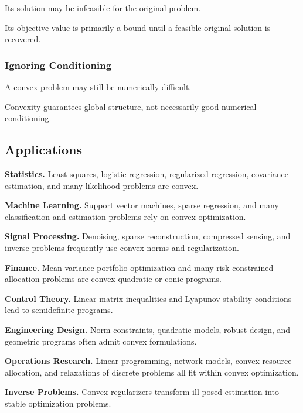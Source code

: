 Its solution may be infeasible for the original problem.

Its objective value is primarily a bound until a feasible original
solution is recovered.

\subsubsection{Ignoring Conditioning}

A convex problem may still be numerically difficult.

Convexity guarantees global structure, not necessarily good numerical
conditioning.

\subsection{Applications}
\label{subsec:convex-optimization-applications}

\begin{applicationbox}

\textbf{Statistics.}
Least squares, logistic regression, regularized regression, covariance
estimation, and many likelihood problems are convex.

\medskip

\textbf{Machine Learning.}
Support vector machines, sparse regression, and many classification and
estimation problems rely on convex optimization.

\medskip

\textbf{Signal Processing.}
Denoising, sparse reconstruction, compressed sensing, and inverse
problems frequently use convex norms and regularization.

\medskip

\textbf{Finance.}
Mean-variance portfolio optimization and many risk-constrained allocation
problems are convex quadratic or conic programs.

\medskip

\textbf{Control Theory.}
Linear matrix inequalities and Lyapunov stability conditions lead to
semidefinite programs.

\medskip

\textbf{Engineering Design.}
Norm constraints, quadratic models, robust design, and geometric programs
often admit convex formulations.

\medskip

\textbf{Operations Research.}
Linear programming, network models, convex resource allocation, and
relaxations of discrete problems all fit within convex optimization.

\medskip

\textbf{Inverse Problems.}
Convex regularizers transform ill-posed estimation into stable
optimization problems.

\end{applicationbox}

